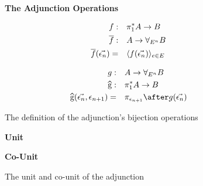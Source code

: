 \documentclass{Report}
\begin{document}
\begin{figure}
    \begin{framed}
        


        \centering
        \textbf{The Adjunction Operations}
        

        \begin{align*}
            f:&\quad \pi_1^* A \rightarrow B\\
            \overline{f}:&\quad A\rightarrow \forall_{E^n} B\\
            \overline{f}(\vec{\epsilon_n}) =&\quad \langle f(\vec{\epsilon_n})\rangle_{e\in E}
        \end{align*}
        

        \begin{align*}
            g:&\quad A \rightarrow \allEn B\\
            \widehat{g}:&\quad \pstar A\rightarrow B\\
            \widehat{g}(\env, \e_{n+1}) =&\quad\pi_{\e_{n+1}}\after g(\env)
        \end{align*}
    \end{framed}

    \caption{The definition of the adjunction's bijection operations}
    \label{AdjunctionDefinition}
\end{figure}



\begin{figure}
    \centering
    \begin{minipage}{0.45\textwidth}
      \begin{framed}
        \centering
        \textbf{Unit}
  
      \end{framed}
    \end{minipage}
    \quad
    \begin{minipage}{0.45\textwidth}
      \begin{framed}
        \centering
        \textbf{Co-Unit}
  
      \end{framed}
    \end{minipage}

\caption{The unit and co-unit of the adjunction}
    \label{UnitCoUnitDefinition}
\end{figure}
\end{document}

